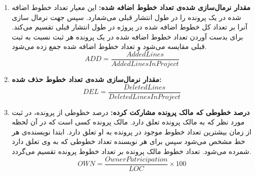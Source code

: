 \begin{enumerate}

	\item
	\textbf{مقدار نرمال‌سازی شده‌ی تعداد خطوط اضافه شده:}
	این معیار تعداد خطوط اضافه شده در یک پرونده را در طول انتشار قبلی می‌شمارد. سپس جهت نرمال سازی آنرا بر تعداد کل خطوط اضافه شده در پروژه در طول انتشار قبلی تقسیم می‌کند. برای بدست آوردن تعداد خطوط اضافه شده در یک پرونده هر ثبت نسبت به ثبت قبلی مقایسه می‌شود و تعداد خطوط اضافه شده جمع زده می‌شود.
\begin{equation} \label{eq:added_line}
ADD = \frac{AddedLines}{AddedLinesInProject}
\end{equation}

	\item
	\textbf{مقدار نرمال‌سازی شده‌ی تعداد خطوط حذف شده:}
\begin{equation} \label{eq:deleted_line}
	DEL = \frac{DeletedLines}{DeletedLinesInProject}
\end{equation}

	\item
	\textbf{درصد خطوطی که مالک پرونده مشارکت کرده:}
	درصد خطوطی  از پرونده، در  ثبت مورد نظر  که به مالک پرونده تعلق دارد. مالک پرونده کسی است که در آن لحظه از زمان بیشترین تعداد خطوط موجود در پرونده به او تعلق دارد. ابتدا نویسنده‌ی هر خط مشخص می‌شود سپس برای هر نویسنده تعداد خطوطی که به وی تعلق دارد شمرده می‌شود. تعداد خطوط مالک پرونده بر تعداد خطوط پرونده تقسیم می‌گردد.
\begin{equation} \label{eq:own}
OWN = \frac{OwnerPatricipation}{LOC} \times 100
\end{equation}


\end{enumerate}
